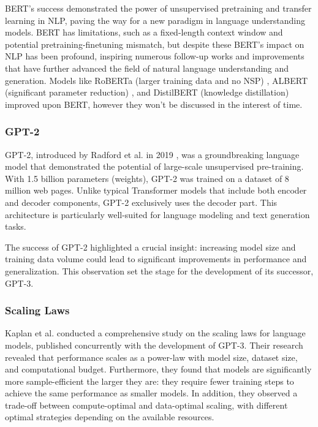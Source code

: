 \documentclass[a4paper, oneside]{discothesis}
\begin{document}
BERT's success demonstrated the power of unsupervised pretraining and transfer learning in NLP, paving the way for a new paradigm in language understanding models. BERT has limitations, such as a fixed-length context window and potential pretraining-finetuning mismatch, but despite these BERT's impact on NLP has been profound, inspiring numerous follow-up works and improvements that have further advanced the field of natural language understanding and generation. Models like RoBERTa (larger training data and no NSP) \cite{liu2019roberta}, ALBERT (significant parameter reduction) \cite{lan2019albert}, and DistilBERT (knowledge distillation) \cite{sanh2019distilbert} improved upon BERT, however they won't be discussed in the interest of time. 

\subsubsection{GPT-2}
GPT-2, introduced by Radford et al. in 2019 \cite{radford2019language}, was a groundbreaking language model that demonstrated the potential of large-scale unsupervised pre-training. With 1.5 billion parameters (weights), GPT-2 was trained on a dataset of 8 million web pages. Unlike typical Transformer models that include both encoder and decoder components, GPT-2 exclusively uses the decoder part. This architecture is particularly well-suited for language modeling and text generation tasks.

The success of GPT-2 highlighted a crucial insight: increasing model size and training data volume could lead to significant improvements in performance and generalization. This observation set the stage for the development of its successor, GPT-3.

\subsubsection{Scaling Laws}
Kaplan et al. \cite{kaplan2020scaling} conducted a comprehensive study on the scaling laws for language models, published concurrently with the development of GPT-3. Their research revealed that performance scales as a power-law with model size, dataset size, and computational budget. Furthermore, they found that models are significantly more sample-efficient the larger they are: they require fewer training steps to achieve the same performance as smaller models. In addition, they observed a trade-off between compute-optimal and data-optimal scaling, with different optimal strategies depending on the available resources.
\end{document}
